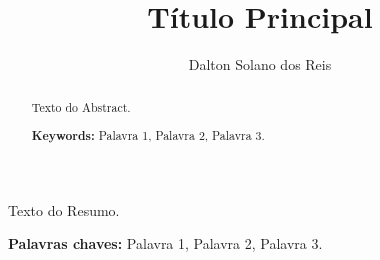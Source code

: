 \documentclass[12pt]{article}
\title{Título Principal}
\author{Dalton Solano dos Reis\inst{1}}
\begin{document}
 
\makeatletter
\renewcommand{\@cite}[2]{({#1\if@tempswa , #2\fi})}
\makeatother


\maketitle

\begin{abstract}
Texto do Abstract.

\textbf{Keywords:} Palavra 1, Palavra 2, Palavra 3.
\end{abstract}
     
\begin{resumo} 
Texto do Resumo.

\textbf{Palavras chaves:} Palavra 1, Palavra 2, Palavra 3.
\end{resumo}












\end{document}
